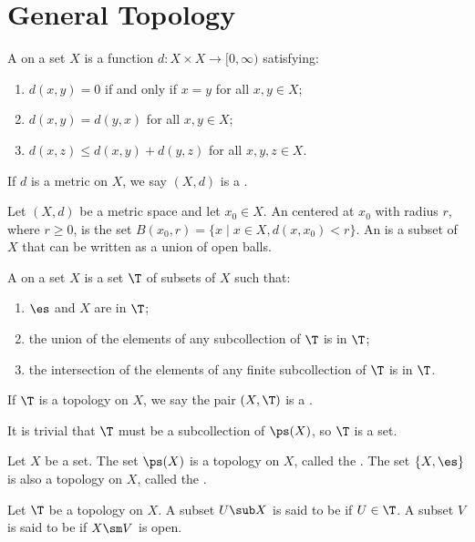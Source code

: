 \documentclass[10pt]{article}
\begin{document}
\section{General Topology}
\begin{definition}
    A  on a set $X$ is a function $d:X\times X\to[0,\infty)$ satisfying:
    \begin{enumerate}
        \item $d(x,y)=0$ if and only if $x=y$ for all $x,y\in X$;
        \item $d(x,y)=d(y,x)$ for all $x,y\in X$;
        \item $d(x,z)\le d(x,y)+d(y,z)$ for all $x,y,z\in X$.
    \end{enumerate}
    If $d$ is a metric on $X$, we say $(X,d)$ is a .
\end{definition}
\begin{definition}
    Let $(X,d)$ be a metric space and let ${x}_{0}\in X$. An  centered at ${x}_{0}$ with radius $r$, where $r\ge 0$, is the set $B({x}_{0},r)=\{x\mid x\in X,d(x,{x}_{0})<r\}$. An  is a subset of $X$ that can be written as a union of open balls.
\end{definition}
\begin{definition}
    A  on a set $X$ is a set $\T$ of subsets of $X$ such that:
    \begin{enumerate}
        \item $\es$ and $X$ are in $\T$;
        \item the union of the elements of any subcollection of $\T$ is in $\T$;
        \item the intersection of the elements of any finite subcollection of $\T$ is in $\T$.
    \end{enumerate}
    If $\T$ is a topology on $X$, we say the pair $(X,\T)$ is a .
\end{definition}
\par
It is trivial that $\T$ must be a subcollection of $\ps(X)$, so $\T$ is a set.
\begin{example}
    Let $X$ be a set. The set $\ps(X)$ is a topology on $X$, called the . The set $\{X,\es\}$ is also a topology on $X$, called the .
\end{example}
\begin{definition}
    Let $\T$ be a topology on $X$. A subset $U\sub X$ is said to be  if $U\in\T$. A subset $V$ is said to be  if $X\sm V$ is open.
\end{definition}
\end{document}

